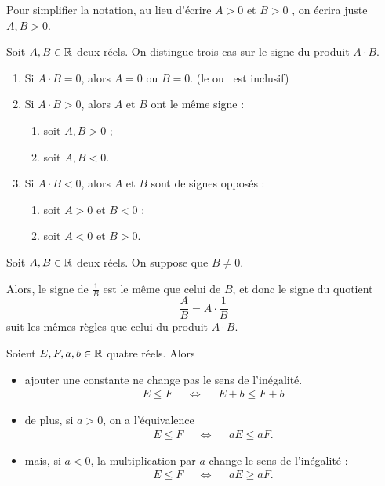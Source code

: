 \documentclass[a4paper, 12pt]{report}
\begin{document}
\begin{nota}
	Pour simplifier la notation, au lieu d'écrire \og $A >0$ et $B > 0$ \fg, on écrira juste \og$A, B > 0$\fg.
\end{nota}

\begin{thm}
	Soit $A, B \in \mathbb{R}$ deux réels.
	On distingue trois cas sur le signe du produit $A \cdot B$.
		\begin{enumerate}
			\item Si $A \cdot B = 0$, alors $A=0$ ou $B=0$. (le \og ou \fg~est inclusif)
			\item Si $A \cdot B > 0$, alors $A$ et $B$ ont le même signe :
				\begin{enumerate}[label=\roman*)]
					\item soit $A, B > 0$ ;
					\item soit $A, B < 0$.
				\end{enumerate}
			\item Si $A \cdot B < 0$, alors $A$ et $B$ sont de signes opposés :
				\begin{enumerate}[label=\roman*)]
					\item soit $A> 0$ et $B < 0$ ;
					\item  soit $A < 0$ et $B > 0$.
				\end{enumerate}
		\end{enumerate}
\end{thm}


\begin{coro}
	Soit $A, B \in \mathbb{R}$ deux réels. On suppose que $B \neq 0$.
	
	Alors, le signe de $\frac1B$ est le même que celui de $B$, et donc le signe du quotient
		\[ \dfrac{A}{B} = A \cdot \dfrac1B \]
	suit les mêmes règles que celui du produit $A \cdot B$.
\end{coro}

\begin{coro}
	Soient $E, F, a, b \in \mathbb{R}$ quatre réels. Alors
	\begin{itemize}
	\item
	ajouter une constante ne change pas le sens de l'inégalité.
		\begin{align*}
			E \leq F && \iff && E+b \leq F+b
		\end{align*}
	\item
	de plus, si $a>0$, on a l'équivalence
		\begin{align*}
			E \leq F && \iff && a E \leq a F.
		\end{align*}
	\item
	mais, si $a<0$, la multiplication par $a$ change le sens de l'inégalité :
		\begin{align*}
			E \leq F && \iff && a E \geq a F.
		\end{align*}
	\end{itemize}
\end{coro}
\end{document}
